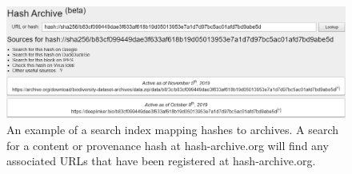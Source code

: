 \begin{figure}[t] %


\includegraphics[width=\textwidth]{figures/fig5_grayscale.png}

\caption{An example of a search index mapping hashes to archives. A search for a content or provenance hash at hash-archive.org will find any associated URLs that have been registered at hash-archive.org.}

\label{fig5} %

\end{figure}
